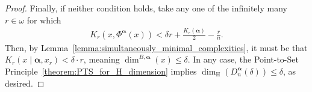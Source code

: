 \begin{proof}
    Finally, if neither condition holds, take any one of the infinitely many $r \in \omega$ for which 
    \begin{align*}
        K_r(x, \Phi^{\boldsymbol{\alpha}}(x)) < \delta r + \frac{K_r(\boldsymbol{\alpha})}{2} - \frac{r}{n}.
    \end{align*}
    Then, by Lemma~\ref{lemma:simultaneously_minimal_complexities}, it must be that $K_r(x \mid \boldsymbol{\alpha}, x_r) < \delta \cdot r$, meaning $\dim^{B, \boldsymbol{\alpha}}(x) \leq \delta$. In any case, the Point-to-Set Principle~\ref{theorem:PTS_for_H_dimension} implies $\dim_{\operatorname{H}}(D^{\boldsymbol{\alpha}}_n(\delta)) \leq \delta$, as desired.
\end{proof}